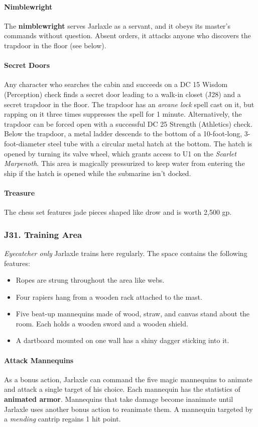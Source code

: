 \documentclass[10pt,a4paper,twoside,twocolumn,openany,nodeprecatedcode]{dndbook}
\begin{document}
\paragraph{Nimblewright}
The \textbf{nimblewright} serves Jarlaxle as a servant, and it obeys its master's commands without question. Absent orders, it attacks anyone who discovers the trapdoor in the floor (see below).
\paragraph{Secret Doors}
Any character who searches the cabin and succeeds on a DC 15 Wisdom (Perception) check finds a secret door leading to a walk-in closet (J28) and a secret trapdoor in the floor.
The trapdoor has an \textit{arcane lock} spell cast on it, but rapping on it three times suppresses the spell for 1 minute. Alternatively, the trapdoor can be forced open with a successful DC 25 Strength (Athletics) check.
Below the trapdoor, a metal ladder descends to the bottom of a 10-foot-long, 3-foot-diameter steel tube with a circular metal hatch at the bottom. The hatch is opened by turning its valve wheel, which grants access to U1 on the \textit{Scarlet Marpenoth}. This area is magically pressurized to keep water from entering the ship if the hatch is opened while the submarine isn't docked.
\paragraph{Treasure}
The chess set features jade pieces shaped like drow and is worth 2,500 gp.
\subsubsection{J31. Training Area}
\textit{Eyecatcher only}
Jarlaxle trains here regularly. The space contains the following features:
\begin{itemize}

\item Ropes are strung throughout the area like webs.
\item Four rapiers hang from a wooden rack attached to the mast.
\item Five beat-up mannequins made of wood, straw, and canvas stand about the room. Each holds a wooden sword and a wooden shield.
\item A dartboard mounted on one wall has a shiny dagger sticking into it.
\end{itemize}


\paragraph{Attack Mannequins}
As a bonus action, Jarlaxle can command the five magic mannequins to animate and attack a single target of his choice. Each mannequin has the statistics of \textbf{animated armor}. Mannequins that take damage become inanimate until Jarlaxle uses another bonus action to reanimate them. A mannequin targeted by a \textit{mending} cantrip regains 1 hit point.
\end{document}
